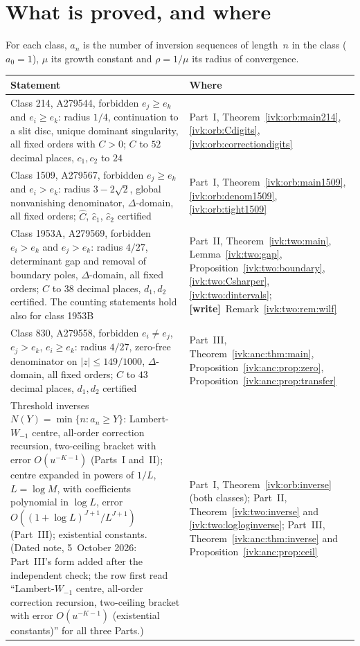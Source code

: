 \documentclass[11pt,letterpaper]{article}
\theoremstyle{remark}\newtheorem{remark}[theorem]{Remark}
\newcommand{\wtag}{\textup{\textbf{[write]}}}
\begin{document}
\section*{What is proved, and where}\label{ivk:sec:status}
For each class, $a_n$ is the number of inversion sequences of length~$n$ in the class ($a_0=1$), $\mu$ its growth constant and $\rho=1/\mu$ its radius of convergence.
\begin{center}
\small
\begin{tabular}{@{}>{\raggedright\arraybackslash}p{} >{\raggedright\arraybackslash}p{}@{}}
\toprule
Statement & Where\\
\midrule
Class 214, A279544, forbidden $e_j\ge e_k$ and $e_i\ge e_k$: radius $1/4$, continuation to a slit disc, unique dominant singularity, all fixed orders with $C>0$; $C$ to $52$ decimal places, $c_1,c_2$ to $24$ & Part~I, Theorem~\ref{ivk:orb:main214}, \eqref{ivk:orb:Cdigits}, \eqref{ivk:orb:correctiondigits}\\
Class 1509, A279567, forbidden $e_j\ge e_k$ and $e_i>e_k$: radius $3-2\sqrt2$, global nonvanishing denominator, $\Delta$-domain, all fixed orders; $\widehat C$, $\widehat c_1$, $\widehat c_2$ certified & Part~I, Theorem~\ref{ivk:orb:main1509}, \eqref{ivk:orb:denom1509}, \eqref{ivk:orb:tight1509}\\
Class 1953A, A279569, forbidden $e_i>e_k$ and $e_j>e_k$: radius $4/27$, determinant gap and removal of boundary poles, $\Delta$-domain, all fixed orders; $C$ to $38$ decimal places, $d_1,d_2$ certified. The counting statements hold also for class 1953B & Part~II, Theorem~\ref{ivk:two:main}, Lemma~\ref{ivk:two:gap}, Proposition~\ref{ivk:two:boundary}, \eqref{ivk:two:Csharper}, \eqref{ivk:two:dintervals}; \wtag\ Remark~\ref{ivk:two:rem:wilf}\\
Class 830, A279558, forbidden $e_i\ne e_j$, $e_j>e_k$, $e_i\ge e_k$: radius $4/27$, zero-free denominator on $|z|\le149/1000$, $\Delta$-domain, all fixed orders; $C$ to $43$ decimal places, $d_1,d_2$ certified & Part~III, Theorem~\ref{ivk:anc:thm:main}, Proposition~\ref{ivk:anc:prop:zero}, Proposition~\ref{ivk:anc:prop:transfer}\\
Threshold inverses $N(Y)=\min\{n:a_n\ge Y\}$: Lambert-$W_{-1}$ centre, all-order correction recursion, two-ceiling bracket with error $O(u^{-K-1})$ (Parts~I and~II); centre expanded in powers of $1/L$, $L=\log M$, with coefficients polynomial in $\log L$, error $O((1+\log L)^{J+1}/L^{J+1})$ (Part~III); existential constants. {\footnotesize(Dated note, 5~October 2026: Part~III's form added after the independent check; the row first read ``Lambert-$W_{-1}$ centre, all-order correction recursion, two-ceiling bracket with error $O(u^{-K-1})$ (existential constants)'' for all three Parts.)} & Part~I, Theorem~\ref{ivk:orb:inverse} (both classes); Part~II, Theorem~\ref{ivk:two:inverse} and \eqref{ivk:two:logloginverse}; Part~III, Theorem~\ref{ivk:anc:thm:inverse} and Proposition~\ref{ivk:anc:prop:ceil}\\

\end{tabular}
\end{center}
\end{document}
